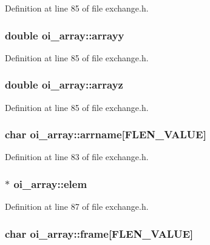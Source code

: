 Definition at line 85 of file exchange.h.

\hypertarget{structoi__array_aaff338ace9d96e21b5f8c6849bd18eb6}{
\subsubsection[{arrayy}]{\setlength{\rightskip}{0pt plus 5cm}double {\bf oi\_\-array::arrayy}}}
\label{structoi__array_aaff338ace9d96e21b5f8c6849bd18eb6}


Definition at line 85 of file exchange.h.

\hypertarget{structoi__array_aa283e8605364147a8a2be34acf58a551}{
\subsubsection[{arrayz}]{\setlength{\rightskip}{0pt plus 5cm}double {\bf oi\_\-array::arrayz}}}
\label{structoi__array_aa283e8605364147a8a2be34acf58a551}


Definition at line 85 of file exchange.h.

\hypertarget{structoi__array_a24769651d50705d2f326eb617eb8a7b9}{
\subsubsection[{arrname}]{\setlength{\rightskip}{0pt plus 5cm}char {\bf oi\_\-array::arrname}\mbox{[}FLEN\_\-VALUE\mbox{]}}}
\label{structoi__array_a24769651d50705d2f326eb617eb8a7b9}


Definition at line 83 of file exchange.h.

\hypertarget{structoi__array_a879ae8d7bd9bb6156639d067f7c039fa}{
\subsubsection[{elem}]{$\ast$ {\bf oi\_\-array::elem}}}
\label{structoi__array_a879ae8d7bd9bb6156639d067f7c039fa}


Definition at line 87 of file exchange.h.

\hypertarget{structoi__array_a0b2f629dcd69627a83d2dd9a27ff7ba7}{
\subsubsection[{frame}]{\setlength{\rightskip}{0pt plus 5cm}char {\bf oi\_\-array::frame}\mbox{[}FLEN\_\-VALUE\mbox{]}}}
\label{structoi__array_a0b2f629dcd69627a83d2dd9a27ff7ba7}


